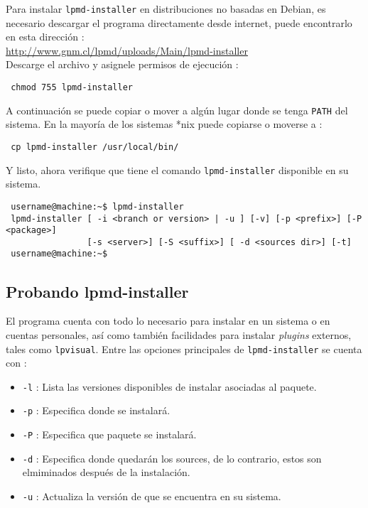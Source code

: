 Para instalar \verb|lpmd-installer| en distribuciones no basadas en Debian, es necesario descargar el programa directamente desde internet, puede encontrarlo en esta direcci\'on :\\

\url{http://www.gnm.cl/lpmd/uploads/Main/lpmd-installer}\\

Descarge el archivo y asignele permisos de ejecuci\'on :

\begin{verbatim}
 chmod 755 lpmd-installer
\end{verbatim}

A continuaci\'on se puede copiar o mover a alg\'un lugar donde se tenga \verb|PATH| del sistema. En la mayor\'ia de los sistemas *nix puede copiarse o moverse a :

\begin{verbatim}
 cp lpmd-installer /usr/local/bin/
\end{verbatim}

Y listo, ahora verifique que tiene el comando \verb|lpmd-installer| disponible en su sistema.
\begin{verbatim}
 username@machine:~$ lpmd-installer 
 lpmd-installer [ -i <branch or version> | -u ] [-v] [-p <prefix>] [-P <package>] 
                [-s <server>] [-S <suffix>] [ -d <sources dir>] [-t]
 username@machine:~$
\end{verbatim}

\subsection{Probando lpmd-installer}
El programa cuenta con todo lo necesario para instalar {\lpmd} en un sistema o en cuentas personales, as\'i como tambi\'en facilidades para instalar \textit{plugins} externos, tales como \verb|lpvisual|. Entre las opciones principales de \verb|lpmd-installer| se cuenta con :

\begin{itemize}
 \item \verb|-l| : Lista las versiones disponibles de instalar asociadas al paquete.
 \item \verb|-p| : Especifica donde se instalar\'a.
 \item \verb|-P| : Especifica que paquete se instalar\'a.
 \item \verb|-d| : Especifica donde quedar\'an los sources, de lo contrario, estos son elmiminados despu\'es de la instalaci\'on.
 \item \verb|-u| : Actualiza la versi\'on de {\lpmd} que se encuentra en su sistema.
\end{itemize}

